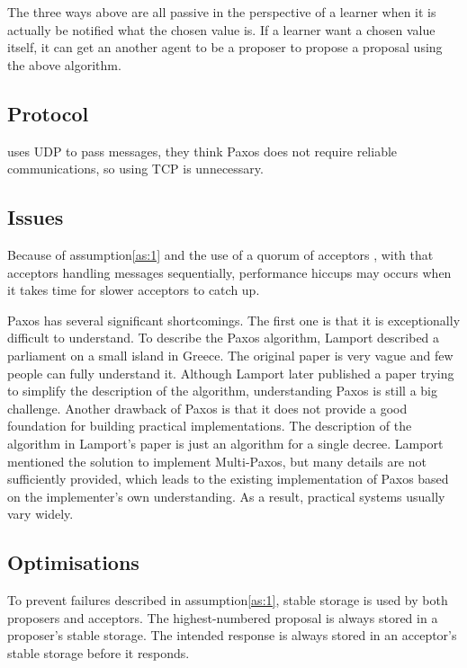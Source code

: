 \documentclass[12pt, a4paper]{article}
\begin{document}
The three ways above are all passive in the perspective of a learner when
it is actually be notified what the chosen value is.
If a learner want a chosen value itself,
it can get an another agent to be  a proposer
to propose a proposal using the above algorithm.
\subsection{Protocol}
\cite{PaxosMadeSwitch-y} uses UDP to pass messages,
they think Paxos does not require reliable communications,
so using TCP is unnecessary.
\subsection{Issues}
Because of assumption\ref{as:1} and
the use of a quorum of acceptors \cite{jalili2014practical},
with that acceptors handling messages sequentially,
performance hiccups may occurs when it takes time for slower acceptors
to catch up.

Paxos has several significant shortcomings. The first one is that it
is exceptionally difficult to understand\cite{conf/usenix/OngaroO14}.
To describe the Paxos algorithm, Lamport described a parliament on a
small island in Greece\cite{lamport1998part}. The original paper is
very vague and few people can fully understand it. Although Lamport
later published a paper trying to simplify the description of the
algorithm\cite{lamport2001paxos}, understanding Paxos is still a big
challenge. Another drawback of Paxos is that it does not provide a
good foundation for building practical implementations\cite{conf/usenix/OngaroO14}.
The description of the algorithm in Lamport's paper is just an
algorithm for a single decree. Lamport mentioned the solution to
implement Multi-Paxos, but many details are not sufficiently provided,
which leads to the existing implementation of Paxos based on the
implementer's own understanding. As a result, practical systems usually
vary widely.

\subsection{Optimisations}
To prevent failures described in assumption\ref{as:1},
stable storage is used by both proposers and acceptors.
The highest-numbered proposal is always stored in a proposer's stable storage.
The intended response is always stored in an acceptor's stable storage
before it responds.

\end{document}
